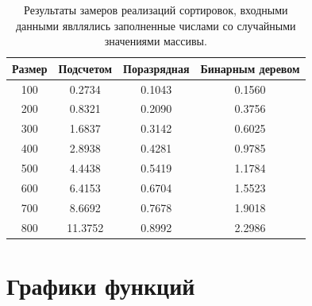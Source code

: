 \newpage

\begin{table}[ht!]
	\begin{center}
			\captionsetup{justification=raggedleft,singlelinecheck=off}
			\caption{Результаты замеров реализаций сортировок, входными данными явллялись заполненные числами со случайными значениями массивы.}
			\label{tbl:random}
			\begin{tabular}{|c|c|c|c|}
				\hline
				Размер & Подсчетом &  Поразрядная &  Бинарным деревом \\
				\hline
				100 & 0.2734 & 0.1043 & 0.1560 \\ 
				\hline
				200 & 0.8321 & 0.2090 & 0.3756 \\ 
				\hline
				300 & 1.6837 & 0.3142 & 0.6025 \\ 
				\hline
				400 & 2.8938 & 0.4281 & 0.9785 \\ 
				\hline
				500 & 4.4438 & 0.5419 & 1.1784 \\ 
				\hline
				600 & 6.4153 & 0.6704 & 1.5523 \\ 
				\hline
				700 & 8.6692 & 0.7678 & 1.9018 \\ 
				\hline
				800 & 11.3752 & 0.8992 & 2.2986 \\ 
				\hline
			\end{tabular}
	\end{center}
\end{table}


\section{Графики функций}


